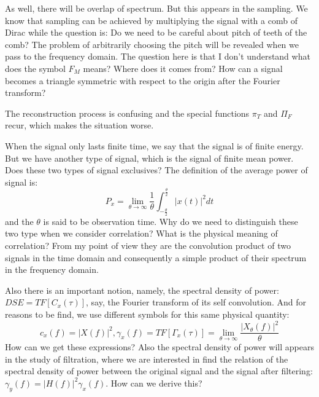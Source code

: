As well, there will be overlap of spectrum. But this appears in the sampling. We know that sampling can be achieved by multiplying the signal with a comb of Dirac while the question is: Do we need to be careful about pitch of teeth of the comb? The problem of arbitrarily choosing the pitch will be revealed when we pass to the frequency domain. The question here is that I don't understand what does the symbol $F_M$ means? Where does it comes from? How can a signal becomes a triangle symmetric with respect to the origin after the Fourier transform?


The reconstruction process is confusing and the special functions $\pi_T$ and $\Pi_F$ recur, which makes the situation worse.

When the signal only lasts finite time, we say that the signal is of finite energy. But we have another type of signal, which is the signal of finite mean power. Does these two types of signal exclusives? The definition of the average power of signal is:
$$
P_x=\lim_{\theta\longrightarrow \infty}\frac{1}{\theta}\int_{-\frac{\theta}{2}}^{\frac{\theta}{2}}|x(t)|^2dt
$$
and the $\theta$ is said to be observation time. Why do we need to distinguish these two type when we consider correlation? What is the physical meaning of correlation? From my point of view they are the convolution product of two signals in the time domain and consequently a simple product of their spectrum in the frequency domain.

Also there is an important notion, namely, the spectral density of power: $DSE=TF[C_x(\tau)]$, say, the Fourier transform of its self convolution. And for reasons to be find, we use different symbols for this same physical quantity:
$$
c_x(f)=|X(f)|^2,\gamma_x(f)=TF[\Gamma_x(\tau)]=\lim_{\theta\to \infty}\frac{|X_{\theta}(f)|^2}{\theta}
$$
How can we get these expressions? Also the spectral density of power will appears in the study of filtration, where we are interested in find the relation of the spectral density of power between the original signal and the signal after filtering: $\gamma_y(f)=|H(f)|^2\gamma_{x}(f)$. How can we derive this?









